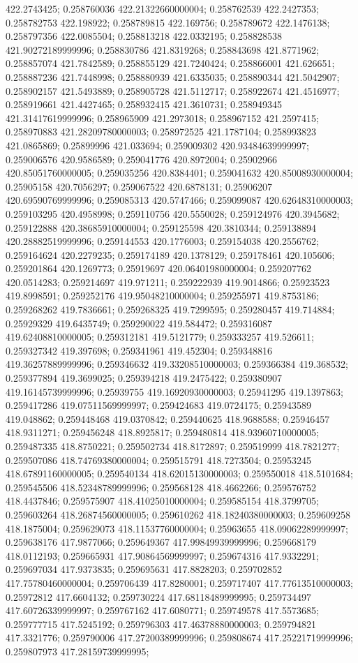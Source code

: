 422.2743425; 0.258760036 422.21322660000004; 0.258762539 422.2427353; 0.258782753 422.198922; 0.258789815 422.169756; 0.258789672 422.1476138; 0.258797356 422.0085504; 0.258813218 422.0332195; 0.258828538 421.90272189999996; 0.258830786 421.8319268; 0.258843698 421.8771962; 0.258857074 421.7842589; 0.258855129 421.7240424; 0.258866001 421.626651; 0.258887236 421.7448998; 0.258880939 421.6335035; 0.258890344 421.5042907; 0.258902157 421.5493889; 0.258905728 421.5112717; 0.258922674 421.4516977; 0.258919661 421.4427465; 0.258932415 421.3610731; 0.258949345 421.31417619999996; 0.258965909 421.2973018; 0.258967152 421.2597415; 0.258970883 421.28209780000003; 0.258972525 421.1787104; 0.258993823 421.0865869; 0.25899996 421.033694; 0.259009302 420.93484639999997; 0.259006576 420.9586589; 0.259041776 420.8972004; 0.25902966 420.85051760000005; 0.259035256 420.8384401; 0.259041632 420.85008930000004; 0.25905158 420.7056297; 0.259067522 420.6878131; 0.25906207 420.69590769999996; 0.259085313 420.5747466; 0.259099087 420.62648310000003; 0.259103295 420.4958998; 0.259110756 420.5550028; 0.259124976 420.3945682; 0.259122888 420.38685910000004; 0.259125598 420.3810344; 0.259138894 420.28882519999996; 0.259144553 420.1776003; 0.259154038 420.2556762; 0.259164624 420.2279235; 0.259174189 420.1378129; 0.259178461 420.105606; 0.259201864 420.1269773; 0.25919697 420.06401980000004; 0.259207762 420.0514283; 0.259214697 419.971211; 0.259222939 419.9014866; 0.25923523 419.8998591; 0.259252176 419.95048210000004; 0.259255971 419.8753186; 0.259268262 419.7836661; 0.259268325 419.7299595; 0.259280457 419.714884; 0.25929329 419.6435749; 0.259290022 419.584472; 0.259316087 419.62408810000005; 0.259312181 419.5121779; 0.259333257 419.526611; 0.259327342 419.397698; 0.259341961 419.452304; 0.259348816 419.36257889999996; 0.259346632 419.33208510000003; 0.259366384 419.368532; 0.259377894 419.3699025; 0.259394218 419.2475422; 0.259380907 419.16145739999996; 0.25939755 419.16920930000003; 0.25941295 419.1397863; 0.259417286 419.07511569999997; 0.259424683 419.0724175; 0.25943589 419.048862; 0.259448468 419.0370842; 0.259440625 418.9688588; 0.25946457 418.9311271; 0.259456248 418.8925817; 0.259480814 418.93960710000005; 0.259487335 418.8750221; 0.259502734 418.8172897; 0.259519999 418.7821277; 0.259507086 418.74769380000004; 0.259515791 418.7273504; 0.25953245 418.67891160000005; 0.259540134 418.62015130000003; 0.259550018 418.5101684; 0.259545506 418.52348789999996; 0.259568128 418.4662266; 0.259576752 418.4437846; 0.259575907 418.41025010000004; 0.259585154 418.3799705; 0.259603264 418.26874560000005; 0.259610262 418.18240380000003; 0.259609258 418.1875004; 0.259629073 418.11537760000004; 0.25963655 418.09062289999997; 0.259638176 417.9877066; 0.259649367 417.99849939999996; 0.259668179 418.0112193; 0.259665931 417.90864569999997; 0.259674316 417.9332291; 0.259697034 417.9373835; 0.259695631 417.8828203; 0.259702852 417.75780460000004; 0.259706439 417.8280001; 0.259717407 417.77613510000003; 0.25972812 417.6604132; 0.259730224 417.68118489999995; 0.259734497 417.60726339999997; 0.259767162 417.6080771; 0.259749578 417.5573685; 0.259777715 417.5245192; 0.259796303 417.46378880000003; 0.259794821 417.3321776; 0.259790006 417.27200389999996; 0.259808674 417.25221719999996; 0.259807973 417.28159739999995; 